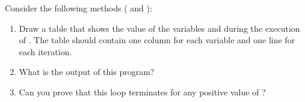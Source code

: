 \begin{exercise}  %

Consider the following methods ( and ):

\begin{enumerate}

\item Draw a table that shows the value of the variables  and  during the execution of .
The table should contain one column for each variable and one line for each iteration.

\item What is the output of this program?

\item Can you prove that this loop terminates for any positive value of ?



\end{enumerate}


\end{exercise}


